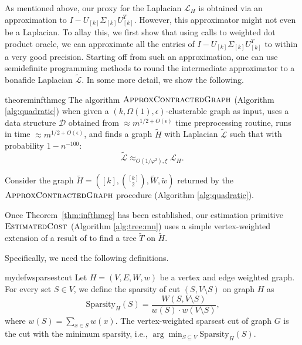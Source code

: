 \documentclass[letterpaper,11pt]{article}
\newcommand{\spp}{\text{Sparsity}}
\newcommand{\cD}{\mathcal{D}}
\newcommand{\cL}{\mathcal{L}}
\theoremstyle{plain}
\theoremstyle{definition}
\theoremstyle{remark}
\newcommand{\e}{\epsilon}
\newcommand{\wt}[1]{\widetilde{#1}}
\begin{document}
\vspace{-5pt}
 As mentioned above, our proxy for the Laplacian $\cL_H$ is obtained via an approximation to $I - U_{[k]} \Sigma_{[k]} U_{[k]}^T$. However, this approximator might not even be a Laplacian. To allay this, we first show that using calls to weighted dot product oracle, we can approximate all the entries of $I - U_{[k]} \Sigma_{[k]} U_{[k]}^T$ to within a very good precision. Starting off from such an approximation, one can use semidefinite programming methods to round the intermediate approximator to a bonafide Laplacian $\widetilde{\cL}$. In some more detail, we show the following.

\begin{restatable}{theorem}{infthmcg}\label{thm:infthmcg}
	The algorithm $\textsc{ApproxContractedGraph}$ (Algorithm \ref{alg:quadratic}) when given a $(k, \Omega(1), \e)$-clusterable graph
	as input, uses a data structure $\cD$ obtained from  $\approx m^{1/2 + O(\e)}$ time preprocessing 
	routine, runs in time $\approx m^{1/2 + O(\e)}$, and finds a graph $\wt{H}$ with Laplacian $\wt{\cL}$
	such that with probability $1-n^{-100}$:
\[ \wt{\cL} \approx_{O(1/\varphi^2), \xi}  \cL_H. \]
\end{restatable} 

 Consider the graph $\wt{H} = \left([k], {[k] \choose 2}, \widetilde{W}, \widetilde{w}\right)$ returned by the $\textsc{ApproxContractedGraph}$ procedure (Algorithm \ref{alg:quadratic}). 

Once Theorem~\ref{thm:infthmcg} has been established, our estimation primitive $\textsc{EstimatedCost}$ (Algorithm \ref{alg:tree:mn}) uses a simple vertex-weighted extension of a result of \cite{charikar2017approximate}
to find a 
tree $\wt{T}$ on $\wt{H}$.


Specifically, we need the following definitions.

\begin{restatable}{mydef}{wsparsestcut}
Let $H=(V,E,W,w)$ be a vertex and edge weighted graph. For every set $S\in V$, we define the sparsity of cut $(S, V\setminus S)$ on graph $H$ as \[\spp_H(S)=\frac{W(S, V\setminus S)}{w(S)\cdot w(V\setminus S)}\text{,}\] where $w(S)=\sum_{x\in S}w(x)$. The vertex-weighted sparsest cut of graph $G$ is the cut with the minimum sparsity, i.e., $\arg\min_{S\subseteq V} \spp_H(S)$.
\end{restatable}
\end{document}
